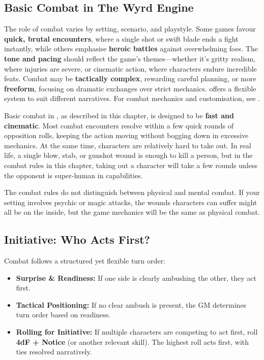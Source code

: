 \begin{multicols}{2}

\section{Basic Combat in The Wyrd Engine}

The role of combat varies by setting, scenario, and playstyle. Some games favour \textbf{quick, brutal encounters}, where a single shot or swift blade ends a fight instantly, while others emphasise \textbf{heroic battles} against overwhelming foes. The \textbf{tone and pacing} should reflect the game's themes—whether it’s gritty realism, where injuries are severe, or cinematic action, where characters endure incredible feats. Combat may be \textbf{tactically complex}, rewarding careful planning, or more \textbf{freeform}, focusing on dramatic exchanges over strict mechanics. \wyrd offers a flexible system to suit different narratives. For combat mechanics and customisation, see .

Basic combat in \wyrd, as described in this chapter, is designed to be \textbf{fast and cinematic}. Most combat encounters resolve within a few quick rounds of opposition rolls, keeping the action moving without bogging down in excessive mechanics. At the same time, characters are relatively hard to take out. In real life, a single blow, stab, or gunshot wound is enough to kill a person, but in the combat rules in this chapter, taking out a character will take a few rounds unless the opponent is super-human in capabilities.

The combat rules do not distinguish between physical and mental combat. If your setting involves psychic or magic attacks, the wounds characters can suffer might all be on the inside, but the game mechanics will be the same as physical combat.

\subsection{Initiative: Who Acts First?}

Combat follows a structured yet flexible turn order:

\begin{Example}
	\begin{itemize}\raggedright
    	\item \textbf{Surprise \& Readiness:} If one side is clearly ambushing the other, they act first.
	    \item \textbf{Tactical Positioning:} If no clear ambush is present, the GM determines turn order based on readiness.
	    \item \textbf{Rolling for Initiative:} If multiple characters are competing to act first, roll \textbf{4dF + Notice} (or another relevant skill). The highest roll acts first, with ties resolved narratively.
	\end{itemize}
\end{Example}


\end{multicols}
